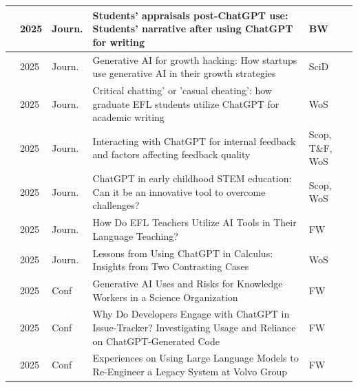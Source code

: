 {\begin{longtable}{|p{}|p{}|p{}|p{}|p{}|}
    \hline
    \cite{Nugroho.2025}&2025&Journ.&Students’ appraisals post-ChatGPT use: Students’ narrative after using ChatGPT for writing&BW\\ 
    \hline
    \cite{Rezazadeh.2025}&2025&Journ.&Generative AI for growth hacking: How startups use generative AI in their growth strategies&SciD\\ 
    \hline
    \cite{Shen.2025}&2025&Journ.&Critical chatting' or 'casual cheating': how graduate EFL students utilize ChatGPT for academic writing&WoS\\ 
    \hline
    \cite{Tam.2025}&2025&Journ.&Interacting with ChatGPT for internal feedback and factors affecting feedback quality&Scop, T\&F, WoS\\ 
    \hline
    \cite{Ugras.2025}&2025&Journ.&ChatGPT in early childhood STEM education: Can it be an innovative tool to overcome challenges?&Scop, WoS\\ 
    \hline
    \cite{Zhou.2025}&2025&Journ.&How Do EFL Teachers Utilize AI Tools in Their Language Teaching?&FW\\ 
    \hline
    \cite{Zhuang.2025}&2025&Journ.&Lessons from Using ChatGPT in Calculus: Insights from Two Contrasting Cases&WoS\\ 
    \hline
    \cite{Wagman.04262025}&2025&Conf&Generative AI Uses and Risks for Knowledge Workers in a Science Organization&FW\\ 
    \hline
    \cite{Das.342025372025}&2025&Conf&Why Do Developers Engage with ChatGPT in Issue-Tracker? Investigating Usage and Reliance on ChatGPT-Generated Code&FW\\ 
    \hline
    \cite{Singh.342025372025}&2025&Conf&Experiences on Using Large Language Models to Re-Engineer a Legacy System at Volvo Group&FW\\ 
    \hline

\end{longtable}
}